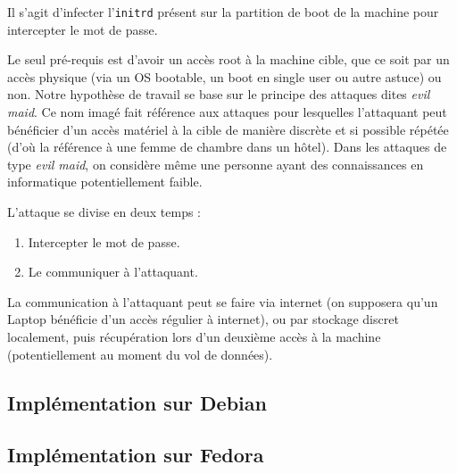 \documentclass[12pt,a4paper]{article}
\begin{document}
Il s'agit d'infecter l'\texttt{initrd} présent sur la partition de boot de la machine pour intercepter le mot de passe.


Le seul pré-requis est d'avoir un accès root à la machine cible, que ce soit par un accès physique (via un OS bootable, un boot en single user ou autre astuce) ou non. Notre hypothèse de travail se base sur le principe des attaques dites \textit{evil maid}. Ce nom imagé fait référence aux attaques pour lesquelles l'attaquant peut bénéficier d'un accès matériel à la cible de manière discrète et si possible répétée (d'où la référence à une femme de chambre dans un hôtel). Dans les attaques de type \textit{evil maid}, on considère même une personne ayant des connaissances en informatique potentiellement faible.

L'attaque se divise en deux temps :
\begin{enumerate}
    \item Intercepter le mot de passe.
    \item Le communiquer à l'attaquant.
\end{enumerate}

La communication à l'attaquant peut se faire via internet (on supposera qu'un Laptop bénéficie d'un accès régulier à internet), ou par stockage discret localement, puis récupération lors d'un deuxième accès à la machine (potentiellement au moment du vol de données).

\subsection{Implémentation sur Debian}



\subsection{Implémentation sur Fedora}
\end{document}
